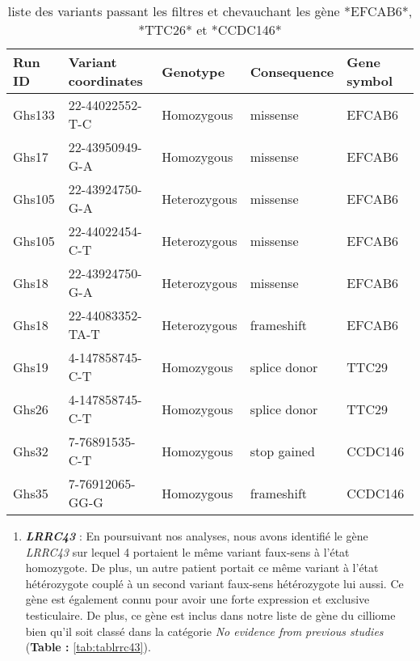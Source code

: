 \documentclass[12pt,twoside]{reedthesis}
\providecommand{\tightlist}{%
  \setlength{\itemsep}{0pt}\setlength{\parskip}{0pt}}
\theoremstyle{definition}
\theoremstyle{definition}
\theoremstyle{remark}
\begin{document}
  \begin{longtable}[t]{lllll}
  \caption{\label{tab:tabefcab6ttc29ccdc146}liste des variants passant les filtres et chevauchant les gène *EFCAB6*, *TTC26* et *CCDC146*}\\
  \toprule
  Run ID & Variant coordinates & Genotype & Consequence & Gene symbol\\
  \midrule
  Ghs133 & 22-44022552-T-C & Homozygous & missense & EFCAB6\\
  Ghs17 & 22-43950949-G-A & Homozygous & missense & EFCAB6\\
  Ghs105 & 22-43924750-G-A & Heterozygous & missense & EFCAB6\\
  Ghs105 & 22-44022454-C-T & Heterozygous & missense & EFCAB6\\
  Ghs18 & 22-43924750-G-A & Heterozygous & missense & EFCAB6\\
  \addlinespace
  Ghs18 & 22-44083352-TA-T & Heterozygous & frameshift & EFCAB6\\
  Ghs19 & 4-147858745-C-T & Homozygous & splice donor & TTC29\\
  Ghs26 & 4-147858745-C-T & Homozygous & splice donor & TTC29\\
  Ghs32 & 7-76891535-C-T & Homozygous & stop gained & CCDC146\\
  Ghs35 & 7-76912065-GG-G & Homozygous & frameshift & CCDC146\\
  \bottomrule
  \end{longtable}
  
  \begin{enumerate}
  \def\labelenumi{\arabic{enumi}.}
  \setcounter{enumi}{2}
  \tightlist
  \item
    \textbf{\emph{LRRC43}} : En poursuivant nos analyses, nous avons
    identifié le gène \emph{LRRC43} sur lequel 4 portaient le même variant
    faux-sens à l'état homozygote. De plus, un autre patient portait ce
    même variant à l'état hétérozygote couplé à un second variant
    faux-sens hétérozygote lui aussi. Ce gène est également connu pour
    avoir une forte expression et exclusive testiculaire. De plus, ce gène
    est inclus dans notre liste de gène du cilliome bien qu'il soit classé
    dans la catégorie \emph{No evidence from previous studies}
    (\textbf{Table : }\ref{tab:tablrrc43}).
  \end{enumerate}
  
\end{document}
